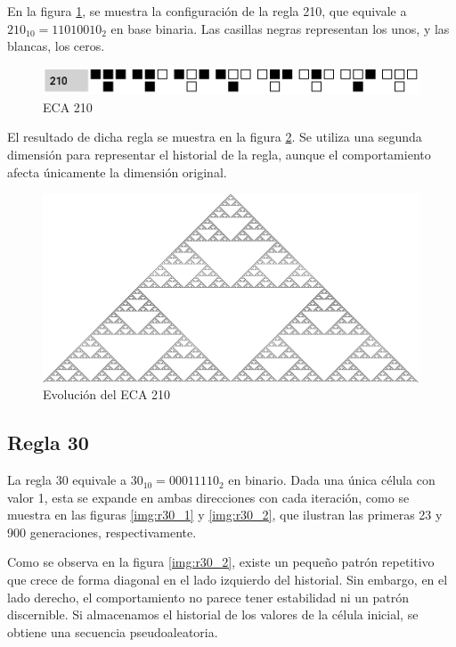 \documentclass[12pt,twoside]{article}
\begin{document}
	En la figura \ref{img:eca1}, se muestra la configuración de la regla 210, que equivale a $210_{10} = 11010010_2$ en base binaria. Las casillas negras representan los unos, y las blancas, los ceros.
	
	\begin{figure}[H]
		\centering
		\includegraphics[width=\textwidth]{img/eca1.png}
		\caption{ECA 210}
		\label{img:eca1}
	\end{figure}
	
	El resultado de dicha regla se muestra en la figura \ref{img:eca2}. Se utiliza una segunda dimensión para representar el historial de la regla, aunque el comportamiento afecta únicamente la dimensión original.
	
	\begin{figure}[H]
		\centering
		\includegraphics[width=\textwidth]{img/eca2.png}
		\caption{Evolución del ECA 210}
		\label{img:eca2}
	\end{figure}
	
	\subsection{Regla 30}
	
	La regla 30 equivale a $30_{10}=00011110_2$ en binario. Dada una única célula con valor 1, esta se expande en ambas direcciones con cada iteración, como se muestra en las figuras \ref{img:r30_1} y \ref{img:r30_2}, que ilustran las primeras 23 y 900 generaciones, respectivamente.
	
	Como se observa en la figura \ref{img:r30_2}, existe un pequeño patrón repetitivo que crece de forma diagonal en el lado izquierdo del historial. Sin embargo, en el lado derecho, el comportamiento no parece tener estabilidad ni un patrón discernible. Si almacenamos el historial de los valores de la célula inicial, se obtiene una secuencia pseudoaleatoria.
	
\end{document}
